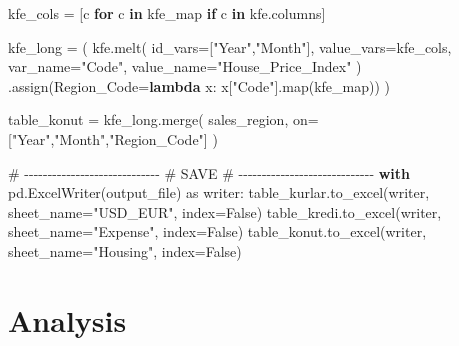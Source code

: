 \documentclass[
  11pt,
  a4paper,
]{article}
\newenvironment{Shaded}{\begin{snugshade}}{\end{snugshade}}
\newcommand{\BuiltInTok}[1]{\textcolor[rgb]{0.00,0.23,0.31}{#1}}
\newcommand{\CommentTok}[1]{\textcolor[rgb]{0.37,0.37,0.37}{#1}}
\newcommand{\ControlFlowTok}[1]{\textcolor[rgb]{0.00,0.23,0.31}{\textbf{#1}}}
\newcommand{\ImportTok}[1]{\textcolor[rgb]{0.00,0.46,0.62}{#1}}
\newcommand{\KeywordTok}[1]{\textcolor[rgb]{0.00,0.23,0.31}{\textbf{#1}}}
\newcommand{\NormalTok}[1]{\textcolor[rgb]{0.00,0.23,0.31}{#1}}
\newcommand{\OperatorTok}[1]{\textcolor[rgb]{0.37,0.37,0.37}{#1}}
\newcommand{\StringTok}[1]{\textcolor[rgb]{0.13,0.47,0.30}{#1}}
\newcommand{\VariableTok}[1]{\textcolor[rgb]{0.07,0.07,0.07}{#1}}
\begin{document}
\begin{Shaded}
\begin{Highlighting}[]
\NormalTok{kfe\_cols }\OperatorTok{=}\NormalTok{ [c }\ControlFlowTok{for}\NormalTok{ c }\KeywordTok{in}\NormalTok{ kfe\_map }\ControlFlowTok{if}\NormalTok{ c }\KeywordTok{in}\NormalTok{ kfe.columns]}

\NormalTok{kfe\_long }\OperatorTok{=}\NormalTok{ (}
\NormalTok{    kfe.melt(}
\NormalTok{        id\_vars}\OperatorTok{=}\NormalTok{[}\StringTok{"Year"}\NormalTok{,}\StringTok{"Month"}\NormalTok{],}
\NormalTok{        value\_vars}\OperatorTok{=}\NormalTok{kfe\_cols,}
\NormalTok{        var\_name}\OperatorTok{=}\StringTok{"Code"}\NormalTok{,}
\NormalTok{        value\_name}\OperatorTok{=}\StringTok{"House\_Price\_Index"}
\NormalTok{    )}
\NormalTok{    .assign(Region\_Code}\OperatorTok{=}\KeywordTok{lambda}\NormalTok{ x: x[}\StringTok{"Code"}\NormalTok{].}\BuiltInTok{map}\NormalTok{(kfe\_map))}
\NormalTok{)}

\NormalTok{table\_konut }\OperatorTok{=}\NormalTok{ kfe\_long.merge(}
\NormalTok{    sales\_region,}
\NormalTok{    on}\OperatorTok{=}\NormalTok{[}\StringTok{"Year"}\NormalTok{,}\StringTok{"Month"}\NormalTok{,}\StringTok{"Region\_Code"}\NormalTok{]}
\NormalTok{)}

\CommentTok{\# {-}{-}{-}{-}{-}{-}{-}{-}{-}{-}{-}{-}{-}{-}{-}{-}{-}{-}{-}{-}{-}{-}{-}{-}{-}{-}{-}{-}{-}}
\CommentTok{\# SAVE}
\CommentTok{\# {-}{-}{-}{-}{-}{-}{-}{-}{-}{-}{-}{-}{-}{-}{-}{-}{-}{-}{-}{-}{-}{-}{-}{-}{-}{-}{-}{-}{-}}
\ControlFlowTok{with}\NormalTok{ pd.ExcelWriter(output\_file) }\ImportTok{as}\NormalTok{ writer:}
\NormalTok{    table\_kurlar.to\_excel(writer, sheet\_name}\OperatorTok{=}\StringTok{"USD\_EUR"}\NormalTok{, index}\OperatorTok{=}\VariableTok{False}\NormalTok{)}
\NormalTok{    table\_kredi.to\_excel(writer, sheet\_name}\OperatorTok{=}\StringTok{"Expense"}\NormalTok{, index}\OperatorTok{=}\VariableTok{False}\NormalTok{)}
\NormalTok{    table\_konut.to\_excel(writer, sheet\_name}\OperatorTok{=}\StringTok{"Housing"}\NormalTok{, index}\OperatorTok{=}\VariableTok{False}\NormalTok{)}
\end{Highlighting}
\end{Shaded}

\section{Analysis}\label{analysis}
\end{document}
